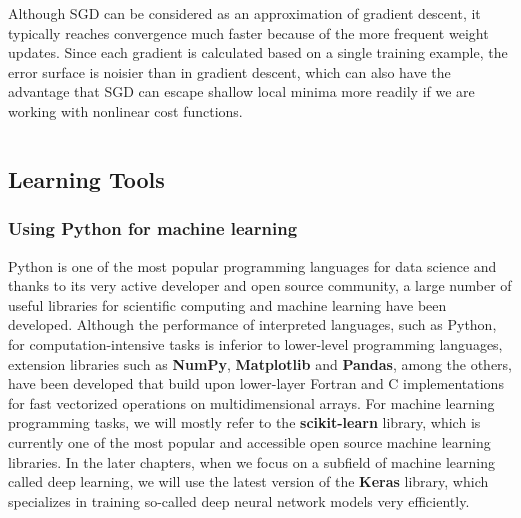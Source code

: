 \documentclass[11pt]{article}
\makeatletter
\newcommand{\boxspacing}{\kern\kvtcb@left@rule\kern\kvtcb@boxsep}
\newcommand{\prompt}[4]{
        {\ttfamily\llap{{\color{#2}[#3]:\hspace{3pt}#4}}\vspace{-\baselineskip}}
    }
\makeatother
\begin{document}
Although SGD can be considered as an approximation of gradient descent,
it typically reaches convergence much faster because of the more
frequent weight updates. Since each gradient is calculated based on a
single training example, the error surface is noisier than in gradient
descent, which can also have the advantage that SGD can escape shallow
local minima more readily if we are working with nonlinear cost
functions.

    \begin{tcolorbox}[breakable, size=fbox, boxrule=1pt, pad at break*=1mm,colback=cellbackground, colframe=cellborder]
\prompt{In}{incolor}{ }{\boxspacing}
\begin{Verbatim}[commandchars=\\\{\}]

\end{Verbatim}
\end{tcolorbox}

    \hypertarget{learning-tools}{%
\subsection{Learning Tools}\label{learning-tools}}

    \hypertarget{using-python-for-machine-learning}{%
\subsubsection{Using Python for machine
learning}\label{using-python-for-machine-learning}}

    Python is one of the most popular programming languages for data science
and thanks to its very active developer and open source community, a
large number of useful libraries for scientific computing and machine
learning have been developed. Although the performance of interpreted
languages, such as Python, for computation-intensive tasks is inferior
to lower-level programming languages, extension libraries such as
\textbf{NumPy}, \textbf{Matplotlib} and \textbf{Pandas}, among the
others, have been developed that build upon lower-layer Fortran and C
implementations for fast vectorized operations on multidimensional
arrays. For machine learning programming tasks, we will mostly refer to
the \textbf{scikit-learn} library, which is currently one of the most
popular and accessible open source machine learning libraries. In the
later chapters, when we focus on a subfield of machine learning called
deep learning, we will use the latest version of the \textbf{Keras}
library, which specializes in training so-called deep neural network
models very efficiently.
\end{document}
